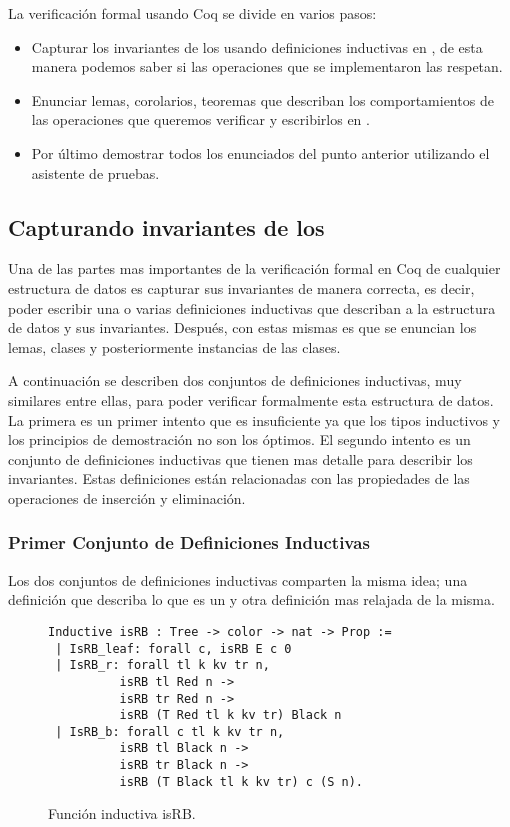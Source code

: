 La verificaci\'on formal usando Coq se divide en varios pasos:
\begin{itemize}
    \item Capturar los invariantes de los {\arns} usando definiciones inductivas en {\coq}, de
    esta manera podemos saber si las operaciones que se implementaron las respetan.
    \item Enunciar lemas, corolarios, teoremas que describan los comportamientos de las
    operaciones que queremos verificar y escribirlos en {\coq}.
    \item Por \'ultimo demostrar todos los enunciados del punto anterior utilizando el asistente
    de pruebas.
\end{itemize}{}

\subsection{Capturando invariantes de los {\Arns}}
Una de las partes mas importantes de la verificaci\'on formal en Coq de cualquier estructura de
datos es capturar sus invariantes de manera correcta, es decir, poder escribir una o varias
definiciones inductivas que describan a la estructura de datos y sus invariantes. Después, con
estas mismas es que se enuncian los lemas, clases y posteriormente instancias de las clases.

A continuaci\'on se describen dos conjuntos de definiciones inductivas, muy similares entre ellas,
para poder verificar formalmente esta estructura de datos. La primera es un primer intento que es
insuficiente ya que los tipos inductivos y los principios de demostraci\'on no son los \'optimos.
El segundo intento es un conjunto de definiciones inductivas que tienen mas detalle para describir
los invariantes. Estas definiciones est\'an relacionadas con las propiedades de las operaciones de
inserci\'on y eliminaci\'on.

\subsubsection{Primer Conjunto de Definiciones Inductivas}
Los dos conjuntos de definiciones inductivas comparten la misma idea; una definici\'on que
describa lo que es un {\arn} y otra definici\'on mas relajada de la misma.

\begin{figure}
\centering
\captionsetup{justification=centering}
\begin{verbatim}
Inductive isRB : Tree -> color -> nat -> Prop :=
 | IsRB_leaf: forall c, isRB E c 0
 | IsRB_r: forall tl k kv tr n,
          isRB tl Red n ->
          isRB tr Red n ->
          isRB (T Red tl k kv tr) Black n
 | IsRB_b: forall c tl k kv tr n,
          isRB tl Black n ->
          isRB tr Black n ->
          isRB (T Black tl k kv tr) c (S n).
\end{verbatim}
\caption{Funci\'on inductiva isRB.}
\label{inductive_isRB}
\end{figure}

